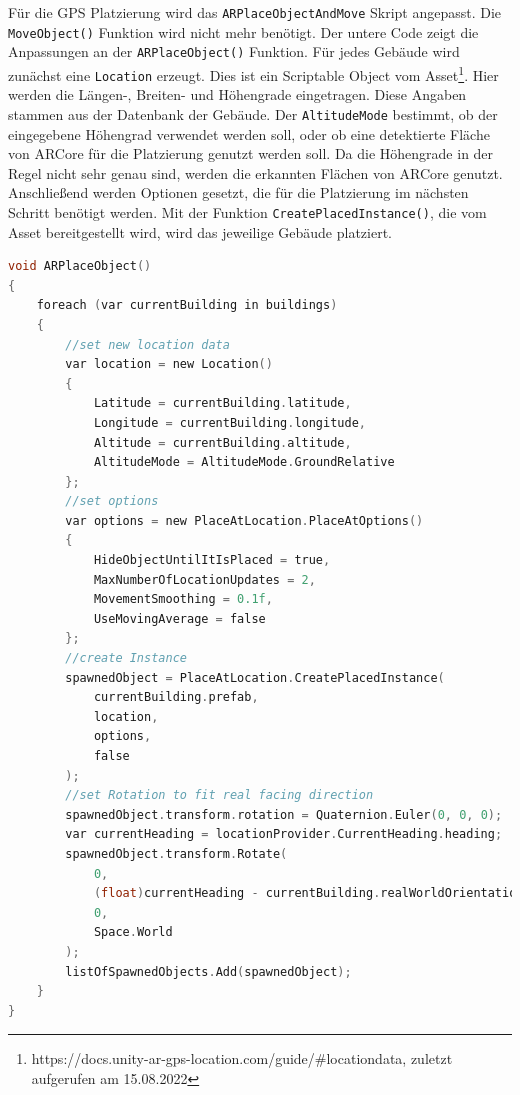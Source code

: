 Für die GPS Platzierung wird das \texttt{ARPlaceObjectAndMove} Skript angepasst. Die \texttt{MoveObject()} Funktion wird nicht mehr benötigt. Der untere Code zeigt die Anpassungen an der \texttt{ARPlaceObject()} Funktion. Für jedes Gebäude wird zunächst eine \texttt{Location} erzeugt. Dies ist ein Scriptable Object vom Asset\footnote{https://docs.unity-ar-gps-location.com/guide/\#locationdata, zuletzt aufgerufen am 15.08.2022}. Hier werden die Längen-, Breiten- und Höhengrade eingetragen. Diese Angaben stammen aus der Datenbank der Gebäude. Der \texttt{AltitudeMode} bestimmt, ob der eingegebene Höhengrad verwendet werden soll, oder ob eine detektierte Fläche von ARCore für die Platzierung genutzt werden soll. Da die Höhengrade in der Regel nicht sehr genau sind, werden die erkannten Flächen von ARCore genutzt. Anschließend werden Optionen gesetzt, die für die Platzierung im nächsten Schritt benötigt werden. Mit der Funktion \texttt{CreatePlacedInstance()}, die vom Asset bereitgestellt wird, wird das jeweilige Gebäude platziert.

\begin{lstlisting}[language=C,caption={Die angepasste \texttt{ARPlaceObject()} Funktion für die Platzierung mit GPS.},captionpos=b,label=lst:GPS-arplaceobject-funktion]
void ARPlaceObject()
{
    foreach (var currentBuilding in buildings)
    {
        //set new location data
        var location = new Location()
        {
            Latitude = currentBuilding.latitude,
            Longitude = currentBuilding.longitude,
            Altitude = currentBuilding.altitude,
            AltitudeMode = AltitudeMode.GroundRelative
        };
        //set options
        var options = new PlaceAtLocation.PlaceAtOptions()
        {
            HideObjectUntilItIsPlaced = true,
            MaxNumberOfLocationUpdates = 2,
            MovementSmoothing = 0.1f,
            UseMovingAverage = false
        };
        //create Instance
        spawnedObject = PlaceAtLocation.CreatePlacedInstance(
            currentBuilding.prefab,
            location,
            options,
            false
        );
        //set Rotation to fit real facing direction
        spawnedObject.transform.rotation = Quaternion.Euler(0, 0, 0);
        var currentHeading = locationProvider.CurrentHeading.heading;
        spawnedObject.transform.Rotate(
            0,
            (float)currentHeading - currentBuilding.realWorldOrientation,
            0,
            Space.World
        );
        listOfSpawnedObjects.Add(spawnedObject);
    }
}
\end{lstlisting}

